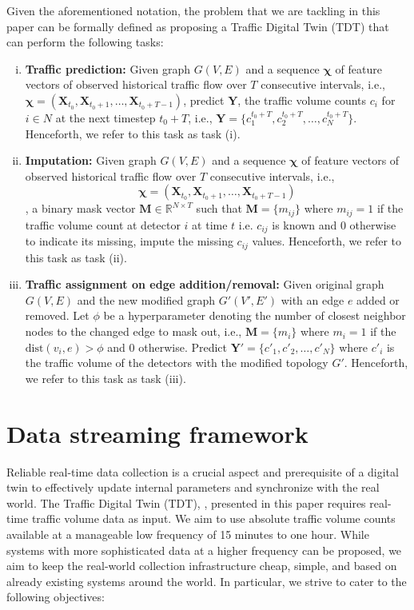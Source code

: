 Given the aforementioned notation, the problem that we are tackling in this paper can be formally defined as proposing a Traffic Digital Twin (TDT) that can perform the following tasks:
\begin{enumerate}[(i)]
    \item \textbf{Traffic prediction:} Given graph $G(V, E)$ and a sequence $\bm{\chi}$ of feature vectors of observed historical traffic flow over $T$ consecutive intervals, i.e., $\bm{\chi} = (\mathbf{X}_{t_0}, \mathbf{X}_{t_0+1}, \ldots, \mathbf{X}_{t_0+T-1})$, predict $\mathbf{Y}$, the traffic volume counts $c_i$ for $i \in N$ at the next timestep $t_0+T$, i.e., $\mathbf{Y} = \{c_1^{t_0+T}, c_2^{t_0+T}, \ldots, c_N^{t_0+T}\}$. Henceforth, we refer to this task as task (i).
    \item \textbf{Imputation:} Given graph $G(V, E)$ and a sequence $\bm{\chi}$ of feature vectors of observed historical traffic flow over $T$ consecutive intervals, i.e., $$\bm{\chi} = (\mathbf{X}_{t_0}, \mathbf{X}_{t_0+1}, \ldots, \mathbf{X}_{t_0+T-1})$$, a binary mask vector $\mathbf{M} \in \mathbb{R}^{N \times T}$ such that $\mathbf{M} = \{m_{ij}\}$ where $m_{ij} = 1$ if the traffic volume count at detector $i$ at time $t$ i.e. $c_{ij}$ is known and 0 otherwise to indicate its missing, impute the missing $c_{ij}$ values. Henceforth, we refer to this task as task (ii).
    \item \textbf{Traffic assignment on edge addition/removal:} Given original graph $G(V,E)$ and the new modified graph $G'(V', E')$ with an edge $e$ added or removed. Let $\phi$ be a hyperparameter denoting the number of closest neighbor nodes to the changed edge to mask out, i.e., $\mathbf{M} = \{m_i\}$ where $m_i = 1$ if the $\text{dist}(v_i,e)> \phi$ and 0 otherwise. Predict $\mathbf{Y'} = \{c'_1, c'_2, \ldots, c'_N \}$ where $c'_i$ is the traffic volume of the detectors with the modified topology $G'$. Henceforth, we refer to this task as task (iii).
\end{enumerate}

\section{\textbf{Data streaming framework}}

Reliable real-time data collection is a crucial aspect and prerequisite of a digital twin to effectively update internal parameters and synchronize with the real world. The Traffic Digital Twin (TDT), \modelname, presented in this paper requires real-time traffic volume data as input. We aim to use absolute traffic volume counts available at a manageable low frequency of 15 minutes to one hour. While systems with more sophisticated data at a higher frequency can be proposed, we aim to keep the real-world collection infrastructure cheap, simple, and based on already existing systems around the world. In particular, we strive to cater to the following objectives:

